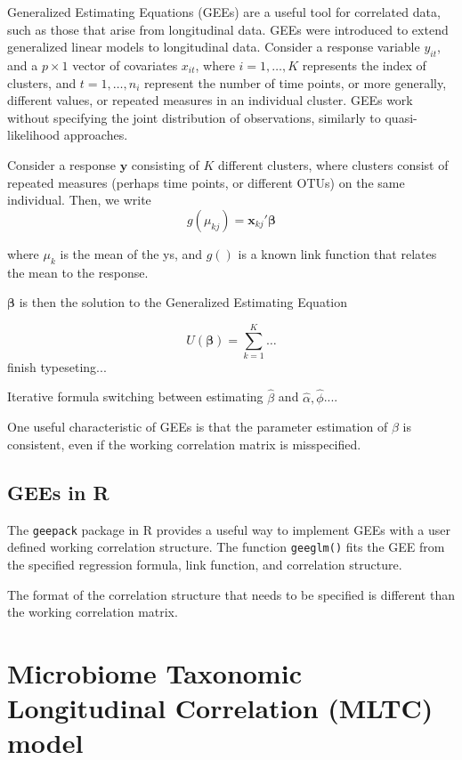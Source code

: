 \documentclass[12pt]{article}
\begin{document}
Generalized Estimating Equations (GEEs) are a useful tool for correlated data, such as those that arise from longitudinal data. GEEs were introduced to extend generalized linear models to longitudinal data. \cite{liang1986longitudinal} Consider a response variable $y_{it}$, and a $p \times 1$ vector of covariates $x_{it}$, where $i = 1, \ldots , K$ represents the index of clusters, and $t = 1, \ldots , n_i$ represent the number of time points, or more generally, different values, or repeated measures in an individual cluster. GEEs work without specifying the joint distribution of observations, similarly to quasi-likelihood approaches.

Consider a response $\mathbf{y}$ consisting of $K$ different clusters, where clusters consist of repeated measures (perhaps time points, or different OTUs) on the same individual. Then, we write
$$g(\mu_{kj}) = \mathbf{x}_{kj}'\boldsymbol \beta$$

where $\mu_{k}$ is the mean of the ys, and $g()$ is a known link function that relates the mean to the response.

$\boldsymbol\beta$ is then the solution to the Generalized Estimating Equation

$$U(\boldsymbol\beta) = \sum_{k = 1}^K \ldots $$
finish typeseting...

Iterative formula switching between estimating $\hat\beta$ and $\hat \alpha, \hat \phi$....

One useful characteristic of GEEs is that the parameter estimation of $\beta$ is consistent, even if the working correlation matrix is misspecified.

\subsection{GEEs in R}

The \texttt{geepack} package\cite{geepack} in R \cite{R} provides a useful way to implement GEEs with a user defined working correlation structure. The function \texttt{geeglm()} fits the GEE from the specified regression formula, link function, and correlation structure.

The format of the correlation structure that needs to be specified is different than the working correlation matrix.



\section{Microbiome Taxonomic Longitudinal Correlation (MLTC) model}
\end{document}
